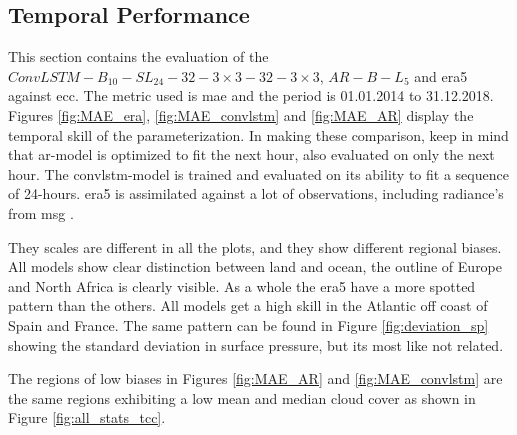 \subsection{Temporal Performance}
This section contains the evaluation of the $ConvLSTM-B_{10}-SL_{24}-32-3\times3-32-3 \times3$, $AR-B-L_5$ and \acrshort{era5} against \acrshort{ecc}. The metric used is \acrshort{mae} and the period is 01.01.2014 to 31.12.2018. Figures \ref{fig:MAE_era}, \ref{fig:MAE_convlstm} and \ref{fig:MAE_AR} display the temporal skill of the parameterization.%
In making these comparison, keep in mind that \acrshort{ar}-model is optimized to fit the next hour, also evaluated on only the next hour. The \acrshort{convlstm}-model is trained and evaluated on its ability to fit a sequence of 24-hours. \acrshort{era5} is assimilated against a lot of observations, including radiance's from \acrlong{msg} \cite{ERA52020}.

They scales are different in all the plots, and they show different regional biases. All models show clear distinction between land and ocean, the outline of Europe and North Africa is clearly visible.
As a whole the \acrshort{era5} have a more spotted pattern than the others. All models get a high skill in the Atlantic off coast of Spain and France. The same pattern can be found in Figure \ref{fig:deviation_sp} showing the standard deviation in surface pressure, but its most like not related.

The regions of low biases in Figures \ref{fig:MAE_AR} and \ref{fig:MAE_convlstm} are the same regions exhibiting a low mean and median cloud cover as shown in Figure \ref{fig:all_stats_tcc}.

